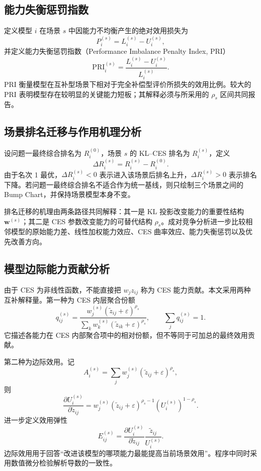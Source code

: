 \subsection{能力失衡惩罚指数}

定义模型 $i$ 在场景 $s$ 中因能力不均衡产生的绝对效用损失为
\[
P_i^{(s)}=L_i^{(s)}-U_i^{(s)},
\]
并定义能力失衡惩罚指数（Performance Imbalance Penalty Index, PRI）
\[
\boxed{
\mathrm{PRI}_i^{(s)}=
\frac{L_i^{(s)}-U_i^{(s)}}{L_i^{(s)}}
}.
\]
PRI 衡量模型在互补型场景下相对于完全补偿型评价所损失的效用比例。较大的 PRI 表明模型存在较明显的关键能力短板；其解释必须与所采用的 $\rho_s$ 区间共同报告。

\subsection{场景排名迁移与作用机理分析}

设问题一最终综合排名为 $R_i^{(0)}$，场景 $s$ 的 KL--CES 排名为 $R_i^{(s)}$，定义
\[
\boxed{\Delta R_i^{(s)}=R_i^{(s)}-R_i^{(0)}}.
\]
由于名次 1 最优，$\Delta R_i^{(s)}<0$ 表示进入该场景后排名上升，$\Delta R_i^{(s)}>0$ 表示排名下降。若问题一最终综合排名不适合作为统一基线，则只绘制三个场景之间的 Bump Chart，并保持场景模型本身不变。

排名迁移的机理由两条路径共同解释：其一是 KL 投影改变能力的重要性结构 $\boldsymbol w^{(s)}$；其二是 CES 参数改变能力的可替代结构 $\rho_s$。成对竞争分析进一步比较相邻模型的原始能力差、线性加权能力效应、CES 曲率效应、能力失衡惩罚以及优先改善方向。

\subsection{模型边际能力贡献分析}

由于 CES 为非线性函数，不能直接把 $w_jz_{ij}$ 称为 CES 能力贡献。本文采用两种互补解释量。第一种为 CES 内层聚合份额
\[
q_{ij}^{(s)}=
\frac{w_j^{(s)}(\widetilde z_{ij}+\varepsilon)^{\rho_s}}
{\sum_k w_k^{(s)}(\widetilde z_{ik}+\varepsilon)^{\rho_s}},
\qquad \sum_jq_{ij}^{(s)}=1.
\]
它描述各能力在 CES 内部聚合项中的相对份额，但不等同于可加总的最终效用贡献。

第二种为边际效用。记
\[
A_i^{(s)}=\sum_jw_j^{(s)}(\widetilde z_{ij}+\varepsilon)^{\rho_s},
\]
则
\[
\frac{\partial U_i^{(s)}}{\partial \widetilde z_{ij}}
=w_j^{(s)}(\widetilde z_{ij}+\varepsilon)^{\rho_s-1}
\left(U_i^{(s)}\right)^{1-\rho_s}.
\]
进一步定义效用弹性
\[
E_{ij}^{(s)}=
\frac{\partial U_i^{(s)}}{\partial \widetilde z_{ij}}
\frac{\widetilde z_{ij}}{U_i^{(s)}}.
\]
边际效用用于回答“改进该模型的哪项能力最能提高当前场景效用”。程序中同时采用数值微分检验解析导数的一致性。


